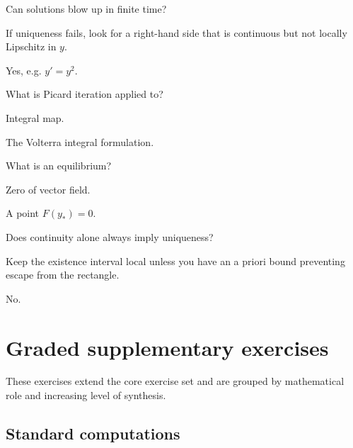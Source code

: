 \begin{exercise}\label{exr:ii19-05}
Can solutions blow up in finite time?
\end{exercise}
\begin{hint}
If uniqueness fails, look for a right-hand side that is continuous but not locally Lipschitz in \(y\).
\end{hint}
\begin{solution}
Yes, e.g. $y'=y^2$.
\end{solution}

\begin{exercise}\label{exr:ii19-06}
What is Picard iteration applied to?
\end{exercise}
\begin{hint}
Integral map.
\end{hint}
\begin{solution}
The Volterra integral formulation.
\end{solution}

\begin{exercise}\label{exr:ii19-07}
What is an equilibrium?
\end{exercise}
\begin{hint}
Zero of vector field.
\end{hint}
\begin{solution}
A point $F(y_*)=0$.
\end{solution}

\begin{exercise}\label{exr:ii19-08}
Does continuity alone always imply uniqueness?
\end{exercise}
\begin{hint}
Keep the existence interval local unless you have an a priori bound preventing escape from the rectangle.
\end{hint}
\begin{solution}
No.
\end{solution}


\section{Graded supplementary exercises}
These exercises extend the core exercise set and are grouped by mathematical role and increasing level of synthesis.

\subsection*{Standard computations}

